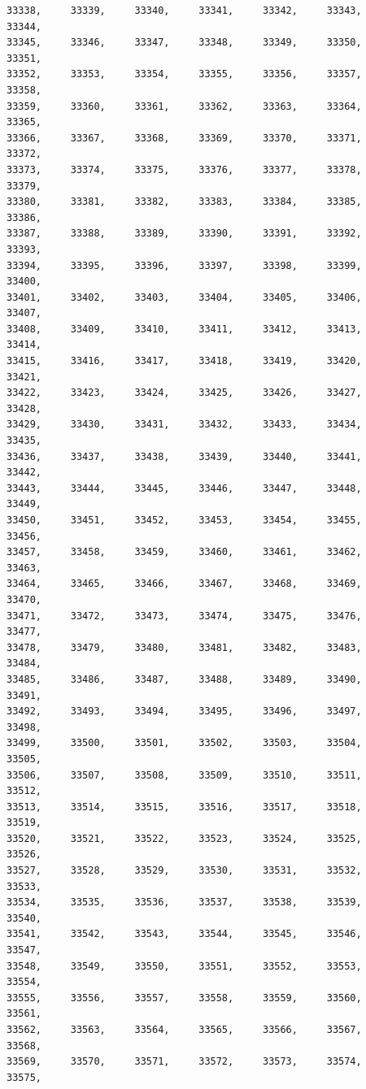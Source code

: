 \documentclass[a4paper,11pt]{report}
\begin{document}
\begin{verbatim}
33338,     33339,     33340,     33341,     33342,     33343,     33344,     
33345,     33346,     33347,     33348,     33349,     33350,     33351,     
33352,     33353,     33354,     33355,     33356,     33357,     33358,     
33359,     33360,     33361,     33362,     33363,     33364,     33365,     
33366,     33367,     33368,     33369,     33370,     33371,     33372,     
33373,     33374,     33375,     33376,     33377,     33378,     33379,     
33380,     33381,     33382,     33383,     33384,     33385,     33386,     
33387,     33388,     33389,     33390,     33391,     33392,     33393,     
33394,     33395,     33396,     33397,     33398,     33399,     33400,     
33401,     33402,     33403,     33404,     33405,     33406,     33407,     
33408,     33409,     33410,     33411,     33412,     33413,     33414,     
33415,     33416,     33417,     33418,     33419,     33420,     33421,     
33422,     33423,     33424,     33425,     33426,     33427,     33428,     
33429,     33430,     33431,     33432,     33433,     33434,     33435,     
33436,     33437,     33438,     33439,     33440,     33441,     33442,     
33443,     33444,     33445,     33446,     33447,     33448,     33449,     
33450,     33451,     33452,     33453,     33454,     33455,     33456,     
33457,     33458,     33459,     33460,     33461,     33462,     33463,     
33464,     33465,     33466,     33467,     33468,     33469,     33470,     
33471,     33472,     33473,     33474,     33475,     33476,     33477,     
33478,     33479,     33480,     33481,     33482,     33483,     33484,     
33485,     33486,     33487,     33488,     33489,     33490,     33491,     
33492,     33493,     33494,     33495,     33496,     33497,     33498,     
33499,     33500,     33501,     33502,     33503,     33504,     33505,     
33506,     33507,     33508,     33509,     33510,     33511,     33512,     
33513,     33514,     33515,     33516,     33517,     33518,     33519,     
33520,     33521,     33522,     33523,     33524,     33525,     33526,     
33527,     33528,     33529,     33530,     33531,     33532,     33533,     
33534,     33535,     33536,     33537,     33538,     33539,     33540,     
33541,     33542,     33543,     33544,     33545,     33546,     33547,     
33548,     33549,     33550,     33551,     33552,     33553,     33554,     
33555,     33556,     33557,     33558,     33559,     33560,     33561,     
33562,     33563,     33564,     33565,     33566,     33567,     33568,     
33569,     33570,     33571,     33572,     33573,     33574,     33575,     

\end{verbatim}
\end{document}
